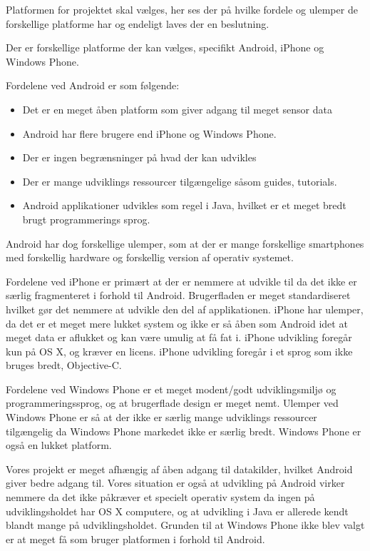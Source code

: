 Platformen for projektet skal vælges, her ses der på hvilke fordele og ulemper de forskellige platforme har og endeligt laves der en beslutning.

Der er forskellige platforme der kan vælges, specifikt Android, iPhone og Windows Phone. 

Fordelene ved Android er som følgende:
\begin{itemize}
\item Det er en meget åben platform som giver adgang til meget sensor data
\item Android har flere brugere end iPhone og Windows Phone.
\item Der er ingen begrænsninger på hvad der kan udvikles
\item Der er mange udviklings ressourcer tilgængelige såsom guides, tutorials.
\item Android applikationer udvikles som regel i Java, hvilket er et meget bredt brugt programmerings sprog.
\end{itemize}

Android har dog forskellige ulemper, som at der er mange forskellige smartphones med forskellig hardware og forskellig version af operativ systemet. 

Fordelene ved iPhone er primært at der er nemmere at udvikle til da det ikke er særlig fragmenteret i forhold til Android. 
Brugerfladen er meget standardiseret hvilket gør det nemmere at udvikle den del af applikationen. 
iPhone har ulemper, da det er et meget mere lukket system og ikke er så åben som Android idet at meget data er aflukket og kan være umulig at få fat i. iPhone udvikling foregår kun på OS X, og kræver en licens. iPhone udvikling foregår i et sprog som ikke bruges bredt, Objective-C.

Fordelene ved Windows Phone er et meget modent/godt udviklingsmiljø og programmeringssprog, og at brugerflade design er meget nemt. 
Ulemper ved Windows Phone er så at der ikke er særlig mange udviklings ressourcer tilgængelig da Windows Phone markedet ikke er særlig bredt. Windows Phone er også en lukket platform.

Vores projekt er meget afhængig af åben adgang til datakilder, hvilket Android giver bedre adgang til. Vores situation er også at udvikling på Android virker nemmere da det ikke påkræver et specielt operativ system da ingen på udviklingsholdet har OS X computere, og at udvikling i Java er allerede kendt blandt mange på udviklingsholdet. Grunden til at Windows Phone ikke blev valgt er at meget få som bruger platformen i forhold til Android.
